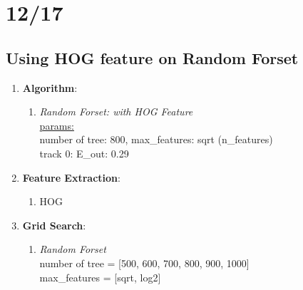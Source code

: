 \documentclass[12pt]{article}
\theoremstyle{definition}
\theoremstyle{remark}
\begin{document}
\section{12/17}
\subsection{Using HOG feature on Random Forset}
\begin{enumerate}
  \item \textbf{Algorithm}:
      \begin{enumerate}
          \item {\em Random Forset: with HOG Feature\/} \\
            \underline{params:} \\
            number of tree: 800, max\_features: sqrt (n\_features)\\
            {\color{red}track 0: E\_out: 0.29}
      \end{enumerate}
    \item \textbf{Feature Extraction}:
      \begin{enumerate}
        \item HOG
      \end{enumerate}
    \item \textbf{Grid Search}:
      \begin{enumerate}
        \item {\em Random Forset\/} \\
          number of tree = [500, 600, 700, 800, 900, 1000] \\
          max\_features = [sqrt, log2]
      \end{enumerate}
\end{enumerate}
\end{document}
